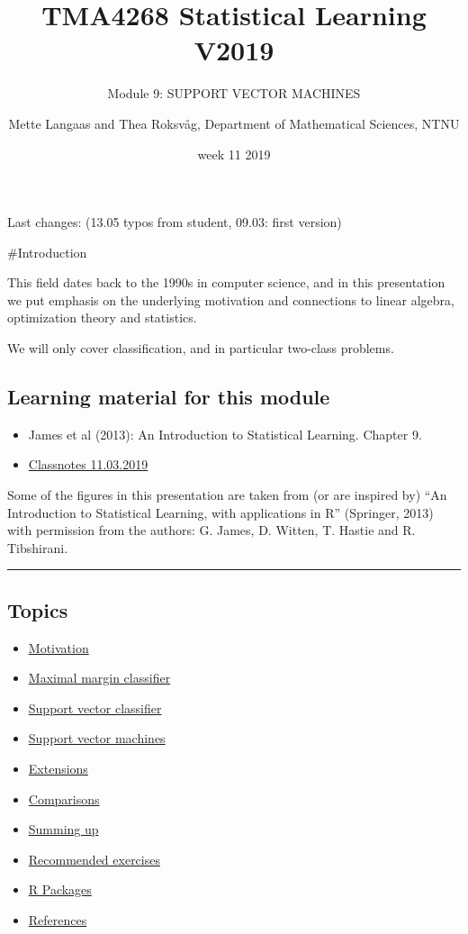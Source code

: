 \documentclass[]{article}
\title{TMA4268 Statistical Learning V2019}
\subtitle{Module 9: SUPPORT VECTOR MACHINES}
\author{Mette Langaas and Thea Roksvåg, Department of Mathematical Sciences,
NTNU}
\date{week 11 2019}
\providecommand{\tightlist}{%
  \setlength{\itemsep}{0pt}\setlength{\parskip}{0pt}}
\begin{document}
\maketitle

{
\setcounter{tocdepth}{2}
\tableofcontents
}
Last changes: (13.05 typos from student, 09.03: first version)

\#Introduction

This field dates back to the 1990s in computer science, and in this
presentation we put emphasis on the underlying motivation and
connections to linear algebra, optimization theory and statistics.

We will only cover classification, and in particular two-class problems.

\hypertarget{learning-material-for-this-module}{%
\subsection{Learning material for this
module}\label{learning-material-for-this-module}}

\begin{itemize}
\tightlist
\item
  James et al (2013): An Introduction to Statistical Learning. Chapter
  9.\\
\item
  \href{https://www.math.ntnu.no/emner/TMA4268/2019v/notes/M9notes.pdf}{Classnotes
  11.03.2019}
\end{itemize}

Some of the figures in this presentation are taken from (or are inspired
by) ``An Introduction to Statistical Learning, with applications in R''
(Springer, 2013) with permission from the authors: G. James, D. Witten,
T. Hastie and R. Tibshirani.

\begin{center}\rule{0.5\linewidth}{\linethickness}\end{center}

\hypertarget{topics}{%
\subsection{Topics}\label{topics}}

\begin{itemize}
\tightlist
\item
  \protect\hyperlink{intro}{Motivation}
\item
  \protect\hyperlink{mmc}{Maximal margin classifier}
\item
  \protect\hyperlink{svc}{Support vector classifier}
\item
  \protect\hyperlink{svm}{Support vector machines}
\item
  \protect\hyperlink{ext}{Extensions}
\item
  \protect\hyperlink{comp}{Comparisons}
\item
  \protect\hyperlink{summing}{Summing up}
\item
  \protect\hyperlink{recex}{Recommended exercises}
\item
  \protect\hyperlink{Rpackages}{R Packages}
\item
  \protect\hyperlink{further}{References}
\end{itemize}
\end{document}
